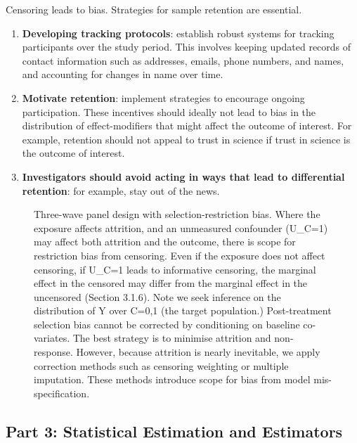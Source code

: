 \documentclass[
  singlecolumn]{article}
\begin{document}
Censoring leads to bias. Strategies for sample retention are essential.

\begin{enumerate}
\def\labelenumi{\alph{enumi}.}
\item
  \textbf{Developing tracking protocols}: establish robust systems for
  tracking participants over the study period. This involves keeping
  updated records of contact information such as addresses, emails,
  phone numbers, and names, and accounting for changes in name over
  time.
\item
  \textbf{Motivate retention}: implement strategies to encourage ongoing
  participation. These incentives should ideally not lead to bias in the
  distribution of effect-modifiers that might affect the outcome of
  interest. For example, retention should not appeal to trust in science
  if trust in science is the outcome of interest.
\item
  \textbf{Investigators should avoid acting in ways that lead to
  differential retention}: for example, stay out of the news.
\end{enumerate}

\begin{figure}


\caption{\label{fig-dag-1}Three-wave panel design with
selection-restriction bias. Where the exposure affects attrition, and an
unmeasured confounder (U\_C=1) may affect both attrition and the
outcome, there is scope for restriction bias from censoring. Even if the
exposure does not affect censoring, if U\_C=1 leads to informative
censoring, the marginal effect in the censored may differ from the
marginal effect in the uncensored (Section 3.1.6). Note we seek
inference on the distribution of Y over C=0,1 (the target population.)
Post-treatment selection bias cannot be corrected by conditioning on
baseline co-variates. The best strategy is to minimise attrition and
non-response. However, because attrition is nearly inevitable, we apply
correction methods such as censoring weighting or multiple imputation.
These methods introduce scope for bias from model mis-specification.}

\end{figure}%

\subsection{Part 3: Statistical Estimation and
Estimators}\label{part-3-statistical-estimation-and-estimators}
\end{document}
